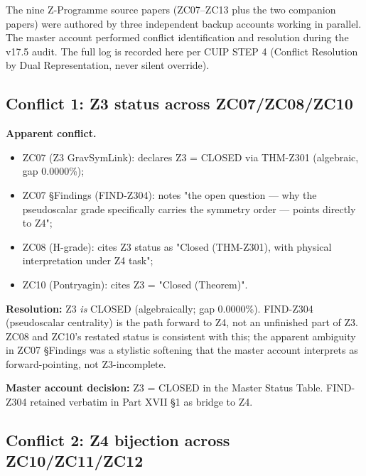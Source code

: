 \documentclass[12pt, a4paper]{article}
\begin{document}
The nine Z-Programme source papers (ZC07--ZC13 plus the two companion
papers) were authored by three independent backup accounts working in
parallel. The master account performed conflict identification and
resolution during the v17.5 audit. The full log is recorded here per
CUIP STEP 4 (Conflict Resolution by Dual Representation, never silent
override).

\subsection{Conflict 1: Z3 status across ZC07/ZC08/ZC10}

\begin{formalbox}[title={Conflict 1 — Z3 closed status}]
\textbf{Apparent conflict.}
\begin{itemize}[leftmargin=*, noitemsep]
  \item ZC07 (Z3 GravSymLink): declares Z3 = CLOSED via THM-Z301
    (algebraic, gap 0.0000\%);
  \item ZC07 \S Findings (FIND-Z304): notes "the open question --- why
    the pseudoscalar grade specifically carries the symmetry order
    --- points directly to Z4";
  \item ZC08 (H-grade): cites Z3 status as "Closed (THM-Z301), with
    physical interpretation under Z4 task";
  \item ZC10 (Pontryagin): cites Z3 = "Closed (Theorem)".
\end{itemize}

\textbf{Resolution:} Z3 \emph{is} CLOSED (algebraically; gap 0.0000\%).
FIND-Z304 (pseudoscalar centrality) is the path forward to Z4, not an
unfinished part of Z3. ZC08 and ZC10's restated status is consistent
with this; the apparent ambiguity in ZC07 \S Findings was a stylistic
softening that the master account interprets as forward-pointing,
not Z3-incomplete.

\textbf{Master account decision:} Z3 = CLOSED in the Master Status
Table. FIND-Z304 retained verbatim in Part XVII §1 as bridge to Z4.
\end{formalbox}

\subsection{Conflict 2: Z4 bijection across ZC10/ZC11/ZC12}
\end{document}
